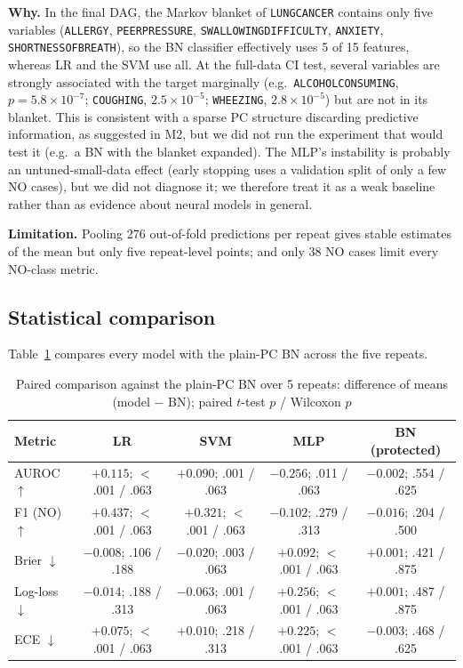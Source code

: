 \documentclass[10pt,twocolumn,letterpaper]{article}
\renewcommand{\_}{\textunderscore\hspace{0pt}}
\newcommand{\V}[1]{{\texttt{\footnotesize #1}}}
\begin{document}
\textbf{Why.} In the final DAG, the Markov blanket of \V{LUNG\_CANCER} contains only five variables (\V{ALLERGY}, \V{PEER\_PRESSURE}, \V{SWALLOWING\_DIFFICULTY}, \V{ANXIETY}, \V{SHORTNESS\_OF\_BREATH}), so the BN classifier effectively uses 5 of 15 features, whereas LR and the SVM use all. At the full-data CI test, several variables are strongly associated with the target marginally (e.g.\ \V{ALCOHOL\_CONSUMING}, $p=5.8\times10^{-7}$; \V{COUGHING}, $2.5\times10^{-5}$; \V{WHEEZING}, $2.8\times10^{-5}$) but are not in its blanket. This is consistent with a sparse PC structure discarding predictive information, as suggested in M2, but we did not run the experiment that would test it (e.g.\ a BN with the blanket expanded). The MLP's instability is probably an untuned-small-data effect (early stopping uses a validation split of only a few NO cases), but we did not diagnose it; we therefore treat it as a weak baseline rather than as evidence about neural models in general.

\textbf{Limitation.} Pooling 276 out-of-fold predictions per repeat gives stable estimates of the mean but only five repeat-level points; and only 38 NO cases limit every NO-class metric.

\subsection{Statistical comparison}
Table~\ref{tab:paired} compares every model with the plain-PC BN across the five repeats.

\begin{table}[t]
\centering
\caption{Paired comparison against the plain-PC BN over 5 repeats: difference of means (model $-$ BN); paired $t$-test $p$ / Wilcoxon $p$}
\label{tab:paired}
\scriptsize
\begin{tabular}{@{}lcccc@{}}
\toprule
Metric & LR & SVM & MLP & BN (protected) \\
\midrule
AUROC $\uparrow$ & $+0.115$; $<$.001 / .063 & $+0.090$; .001 / .063 & $-0.256$; .011 / .063 & $-0.002$; .554 / .625\\
F1 (NO) $\uparrow$ & $+0.437$; $<$.001 / .063 & $+0.321$; $<$.001 / .063 & $-0.102$; .279 / .313 & $-0.016$; .204 / .500\\
Brier $\downarrow$ & $-0.008$; .106 / .188 & $-0.020$; .003 / .063 & $+0.092$; $<$.001 / .063 & $+0.001$; .421 / .875\\
Log-loss $\downarrow$ & $-0.014$; .188 / .313 & $-0.063$; .001 / .063 & $+0.256$; $<$.001 / .063 & $+0.001$; .487 / .875\\
ECE $\downarrow$ & $+0.075$; $<$.001 / .063 & $+0.010$; .218 / .313 & $+0.225$; $<$.001 / .063 & $-0.003$; .468 / .625\\
\bottomrule
\end{tabular}
\end{table}
\end{document}
